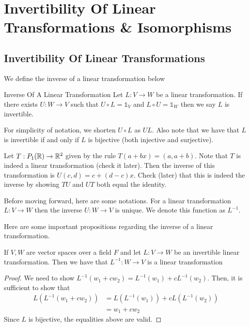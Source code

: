 \documentclass[main.tex]{subfiles}
\begin{document}
    \chapter{Invertibility Of Linear Transformations \& Isomorphisms}

    \section{Invertibility Of Linear Transformations}
    We define the inverse of a linear transformation below

    \begin{defn}{Inverse Of A Linear Transformation}{}
        Let $L: V\to W$ be a linear transformation. If there exists $U: W\to V$ such that $U\circ L = \mathbb{1}_V$ and $L\circ U = \mathbb{1}_W$ then we say $L$ is invertible. 
    \end{defn}
    For simplicity of notation, we shorten $U\circ L$ as $UL$. Also note that we have that $L$ is invertible if and only if $L$ is bijective (both injective and surjective). 

    \begin{example}{}{}
        Let $T: P_1(\mathbb{R}) \to \mathbb{R}^2$ given by the rule $T(a+bx) = (a, a+b)$. Note that $T$ is indeed a linear transformation (check it later). Then the inverse of this transformation is $U(c,d) = c + (d-c)x$. Check (later) that this is indeed the inverse by showing $TU$ and $UT$ both equal the identity.
    \end{example}
    Before moving forward, here are some notations. For a linear transformation $L:V\to W$ then the inverse $U:W\to V$ is unique. We denote this function as $L^{-1}$. \par 

    Here are some important propositions regarding the inverse of a linear transformation. 
    \begin{prop}{}{}
        If $V,W$ are vector spaces over a field $F$ and let $L:V\to W$ be an invertible linear transformation. Then we have that $L^{-1}: W\to V$ is a linear transformation
    \end{prop}
    \begin{proof}
        We need to show $L^{-1}(w_1 + cw_2) = L^{-1}(w_1) + cL^{-1}(w_2)$. Then, it is sufficient to show that 
        \begin{align*}
            L (L^{-1}(w_1 + cw_2)) &= L(L^{-1}(w_1)) + cL(L^{-1}(w_2)) \\
            &= w_1 + cw_2
        \end{align*}
        Since $L$ is bijective, the equalities above are valid.
    \end{proof}
\end{document}
